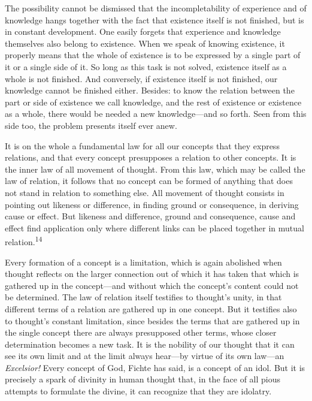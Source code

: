 \documentclass[12pt,a4paper]{book}
\begin{document}
The possibility cannot be dismissed that the incompletability of experience
and of knowledge hangs together with the fact that existence itself is not
finished, but is in constant development. One easily forgets that experience
and knowledge themselves also belong to existence. When we speak of knowing
existence, it properly means that the whole of existence is to be expressed by
a single part of it or a single side of it. So long as this task is not
solved, existence itself as a whole is not finished. And conversely, if
existence itself is not finished, our knowledge cannot be finished either.
Besides: to know the relation between the part or side of existence we call
knowledge, and the rest of existence or existence as a whole, there would be
needed a new knowledge---and so forth. Seen from this side too, the problem
presents itself ever anew.

It is on the whole a fundamental law for all our concepts that they express
relations, and that every concept presupposes a relation to other concepts. It
is the inner law of all movement of thought. From this law, which may be
called the law of relation, it follows that no concept can be formed of
anything that does not stand in relation to something else. All movement of
thought consists in pointing out likeness or difference, in finding ground or
consequence, in deriving cause or effect. But likeness and difference, ground
and consequence, cause and effect find application only where different links
can be placed together in mutual relation.\textsuperscript{14}

Every formation of a concept is a limitation, which is again abolished when
thought reflects on the larger connection out of which it has taken that which
is gathered up in the concept---and without which the concept's content could
not be determined. The law of relation itself testifies to thought's unity, in
that different terms of a relation are gathered up in one concept. But it
testifies also to thought's constant limitation, since besides the terms that
are gathered up in the single concept there are always presupposed other
terms, whose closer determination becomes a new task. It is the nobility of
our thought that it can see its own limit and at the limit always
hear---by virtue of its own law---an \textit{Excelsior!} Every concept of God,
Fichte has said, is a concept of an idol. But it is precisely a spark of
divinity in human thought that, in the face of all pious attempts to formulate
the divine, it can recognize that they are idolatry.
\end{document}
